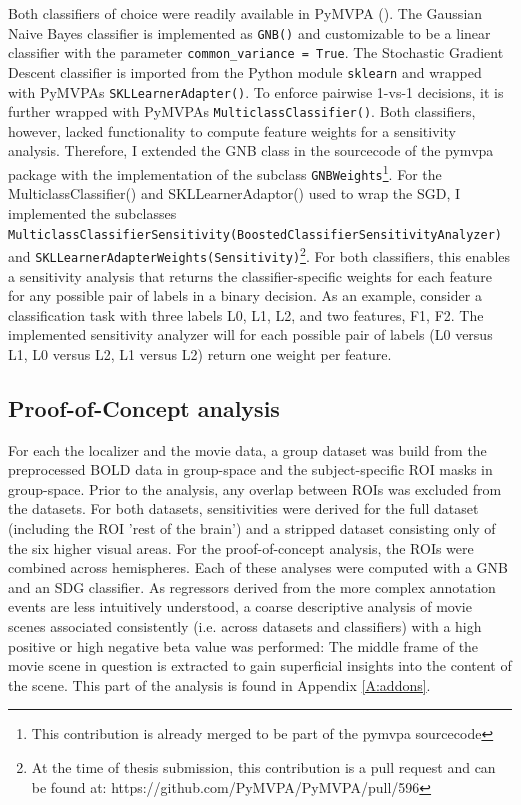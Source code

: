 \documentclass[a4paper, 12pt]{scrreprt}
\begin{document}
Both classifiers of choice were readily available in PyMVPA (\cite{hanke2009pymvpa}). The Gaussian Naive Bayes classifier is implemented as \texttt{GNB()} and customizable to be a linear classifier with the parameter \texttt{common\_variance = True}. The Stochastic Gradient Descent classifier is imported from the Python module \texttt{sklearn} and wrapped with PyMVPAs \texttt{SKLLearnerAdapter()}. To enforce pairwise 1-vs-1 decisions, it is further wrapped with PyMVPAs \texttt{MulticlassClassifier()}. \newline
Both classifiers, however, lacked functionality to compute feature weights for a sensitivity analysis. Therefore, I extended the GNB class in the sourcecode of the pymvpa package with the implementation of the subclass \texttt{GNBWeights}\footnote{This contribution is already merged to be part of the pymvpa sourcecode}. For the MulticlassClassifier() and SKLLearnerAdaptor() used to wrap the SGD, I implemented the subclasses \newline \texttt{MulticlassClassifierSensitivity(BoostedClassifierSensitivityAnalyzer)} and  \texttt{SKLLearnerAdapterWeights(Sensitivity)}\footnote{At the time of thesis submission, this contribution is a pull request and can be found at: https://github.com/PyMVPA/PyMVPA/pull/596}. For both classifiers, this enables a sensitivity analysis that returns the classifier-specific weights for each feature for any possible pair of labels in a binary decision. As an example, consider a classification task with three labels L0, L1, L2, and two features, F1, F2. The implemented sensitivity analyzer will for each possible pair of labels (L0 versus L1, L0 versus L2, L1 versus L2) return one weight per feature. 

\subsection{Proof-of-Concept analysis}

For each the localizer and the movie data, a group dataset was build from the preprocessed BOLD data in group-space and the subject-specific ROI masks in group-space. Prior to the analysis, any overlap between ROIs was excluded from the datasets.
For both datasets, sensitivities were derived for the full dataset (including the ROI 'rest of the brain') and a stripped dataset consisting only of the six higher visual areas. For the proof-of-concept analysis, the ROIs were combined across hemispheres.  Each of these analyses were computed with a GNB and an SDG classifier. As regressors derived from the more complex annotation events are less intuitively understood, a coarse descriptive analysis of movie scenes associated consistently (i.e. across datasets and classifiers) with a high positive or high negative beta value was performed: The middle frame of the movie scene in question is extracted to gain superficial insights into the content of the scene. This part of the analysis is found in Appendix \ref{A:addons}.
\end{document}
